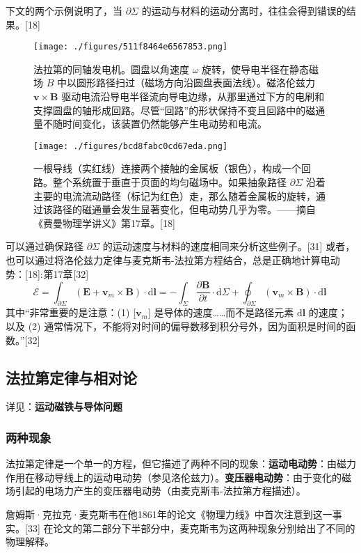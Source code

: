 下文的两个示例说明了，当 \(\partial\Sigma\) 的运动与材料的运动分离时，往往会得到错误的结果。[18]
\begin{figure}[ht]
\centering
\texttt{[image: ./figures/511f8464e6567853.png]}
\caption{法拉第的同轴发电机。圆盘以角速度 \(\omega\) 旋转，使导电半径在静态磁场 \(B\) 中以圆形路径扫过（磁场方向沿圆盘表面法线）。磁洛伦兹力 \(\mathbf{v} \times \mathbf{B}\) 驱动电流沿导电半径流向导电边缘，从那里通过下方的电刷和支撑圆盘的轴形成回路。尽管“回路”的形状保持不变且回路中的磁通量不随时间变化，该装置仍然能够产生电动势和电流。} \label{fig_FLDL_10}
\end{figure}
\begin{figure}[ht]
\centering
\texttt{[image: ./figures/bcd8fabc0cd67eda.png]}
\caption{一根导线（实红线）连接两个接触的金属板（银色），构成一个回路。整个系统置于垂直于页面的均匀磁场中。如果抽象路径 \(\partial\Sigma\) 沿着主要的电流流动路径（标记为红色）走，那么随着金属板的旋转，通过该路径的磁通量会发生显著变化，但电动势几乎为零。——摘自《费曼物理学讲义》第17章。[18]} \label{fig_FLDL_11}
\end{figure}
可以通过确保路径 \(\partial \Sigma\) 的运动速度与材料的速度相同来分析这些例子。[31] 或者，也可以通过将洛伦兹力定律与麦克斯韦-法拉第方程结合，总是正确地计算电动势：[18]: 第17章 [32]
\[
\mathcal{E} = \int_{\partial \Sigma} (\mathbf{E} + \mathbf{v}_m \times \mathbf{B}) \cdot \mathrm{d}\mathbf{l} = -\int_{\Sigma} \frac{\partial \mathbf{B}}{\partial t} \cdot \mathrm{d}\Sigma + \oint_{\partial \Sigma} (\mathbf{v}_m \times \mathbf{B}) \cdot \mathrm{d}\mathbf{l}~
\]
其中“非常重要的是注意：(1) [\(\mathbf{v}_m\)] 是导体的速度……而不是路径元素 \(\mathrm{d}\mathbf{l}\) 的速度；以及 (2) 通常情况下，不能将对时间的偏导数移到积分号外，因为面积是时间的函数。”[32]

\subsection{法拉第定律与相对论 } 
详见：\textbf{运动磁铁与导体问题}  
\subsubsection{两种现象}  
法拉第定律是一个单一的方程，但它描述了两种不同的现象：\textbf{运动电动势}：由磁力作用在移动导线上的运动电动势（参见洛伦兹力）。\textbf{变压器电动势}：由于变化的磁场引起的电场力产生的变压器电动势（由麦克斯韦-法拉第方程描述）。  

詹姆斯·克拉克·麦克斯韦在他1861年的论文《物理力线》中首次注意到这一事实。[33] 在论文的第二部分下半部分中，麦克斯韦为这两种现象分别给出了不同的物理解释。


